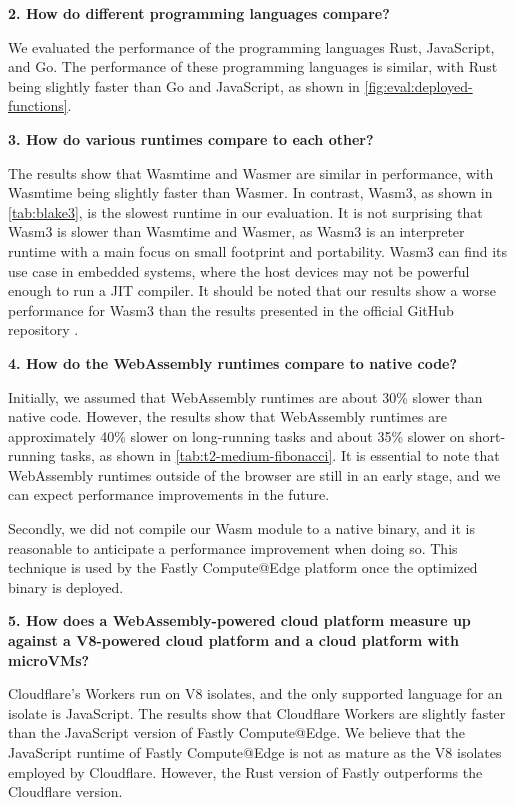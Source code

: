 \textbf{2. How do different programming languages compare?}

We evaluated the performance of the programming languages Rust, JavaScript, and Go. The performance of these programming languages is similar, with Rust being slightly faster than Go and JavaScript, as shown in \autoref{fig:eval:deployed-functions}.

\textbf{3. How do various runtimes compare to each other?}

The results show that Wasmtime and Wasmer are similar in performance, with Wasmtime being slightly faster than Wasmer. In contrast, Wasm3, as shown in \autoref{tab:blake3}, is the slowest runtime in our evaluation. It is not surprising that Wasm3 is slower than Wasmtime and Wasmer, as Wasm3 is an interpreter runtime with a main focus on small footprint and portability. Wasm3 can find its use case in embedded systems, where the host devices may not be powerful enough to run a JIT compiler. It should be noted that our results show a worse performance for Wasm3 than the results presented in the official GitHub repository \cite{shymanskyy_2023_wasm3}. 

\textbf{4. How do the WebAssembly runtimes compare to native code?}

Initially, we assumed that WebAssembly runtimes are about 30\% slower than native code. However, the results show that WebAssembly runtimes are approximately 40\% slower on long-running tasks and about 35\% slower on short-running tasks, as shown in \autoref{tab:t2-medium-fibonacci}. It is essential to note that WebAssembly runtimes outside of the browser are still in an early stage, and we can expect performance improvements in the future.

Secondly, we did not compile our Wasm module to a native binary, and it is reasonable to anticipate a performance improvement when doing so. This technique is used by the Fastly Compute@Edge platform once the optimized binary is deployed.

\textbf{5. How does a WebAssembly-powered cloud platform measure up against a V8-powered cloud platform and a cloud platform with microVMs?}

Cloudflare's Workers run on V8 isolates, and the only supported language for an isolate is JavaScript. The results show that Cloudflare Workers are slightly faster than the JavaScript version of Fastly Compute@Edge. We believe that the JavaScript runtime of Fastly Compute@Edge is not as mature as the V8 isolates employed by Cloudflare. However, the Rust version of Fastly outperforms the Cloudflare version.

